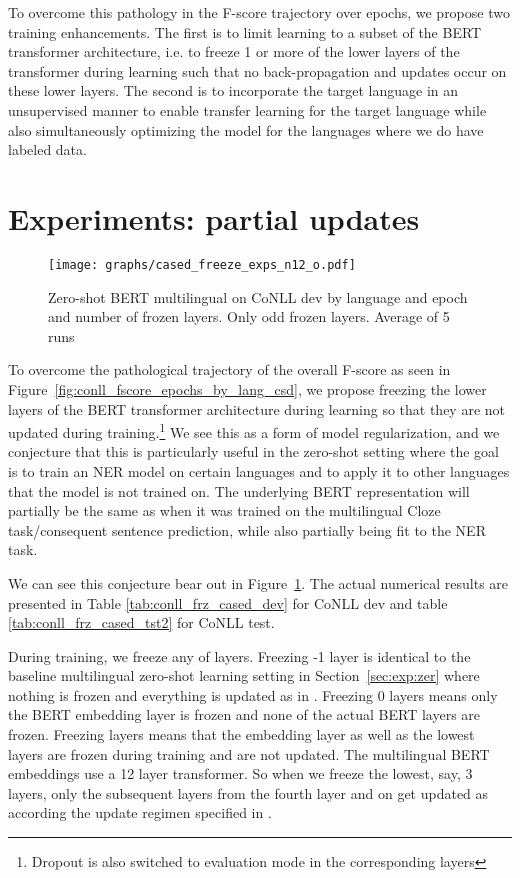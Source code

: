 \documentclass[letterpaper]{article} \usepackage{aaai20}  \usepackage{times}  \usepackage{helvet} \usepackage{courier}  \usepackage[hyphens]{url}  \usepackage{graphicx} \urlstyle{rm} \def\UrlFont{\rm}  \usepackage{graphicx}  \frenchspacing  \setlength{\pdfpagewidth}{8.5in}  \setlength{\pdfpageheight}{11in}  \usepackage{amsmath}
\begin{document}
To overcome this pathology in the F-score trajectory over epochs,
we propose two training enhancements. The first is to limit learning to a subset of the BERT transformer architecture, i.e. to freeze 1 or more of the lower layers of the transformer during learning such that no back-propagation and updates occur on these lower layers. The second is to incorporate the target language in an unsupervised manner to enable transfer learning for the target language while also simultaneously optimizing the model for the languages where we do have labeled data. \section{Experiments: partial updates}
\label{sec:exp:part-up}



\begin{figure}
\texttt{[image: graphs/cased\_freeze\_exps\_n12\_o.pdf]}
\caption{Zero-shot BERT multilingual on CoNLL dev by language and epoch and number
  of frozen layers. Only odd frozen layers. Average of 5 runs}
\label{fig:cased_freeze_exps_n12_o}
\end{figure}



To overcome the pathological trajectory of the overall F-score as seen in Figure~\ref{fig:conll_fscore_epochs_by_lang_csd}, we propose freezing the lower layers of the BERT transformer architecture during learning so that they are not updated during training.\footnote{Dropout is also switched to evaluation
mode in the corresponding layers} We see this as a form of model regularization, and we conjecture that this is particularly useful in the zero-shot setting where the goal is to train an NER model on certain languages and to apply it to other languages that the model is not trained on. The underlying BERT representation will partially be the same as when it was trained on the multilingual Cloze task/consequent sentence prediction, while also partially being fit to the NER task.

We can see this conjecture bear out in Figure~\ref{fig:cased_freeze_exps_n12_o}.
The actual numerical results are presented in
Table \ref{tab:conll_frz_cased_dev} for CoNLL dev and table
\ref{tab:conll_frz_cased_tst2} for CoNLL test. 

During training, we freeze any of  layers. Freezing -1 layer is identical to the baseline multilingual zero-shot learning setting in Section~\ref{sec:exp:zer} where nothing is frozen and everything is updated as in \cite{BERT18}. Freezing 0 layers means only the BERT embedding layer is frozen and none of the actual BERT layers are frozen. Freezing  layers means that the embedding layer as well as the lowest  layers are frozen during training and are not updated. The multilingual BERT embeddings use a 12 layer transformer. So when we freeze the lowest, say, 3 layers, only the subsequent layers from the fourth layer and on get updated as according the update regimen specified in \cite{BERT18}.
\end{document}
